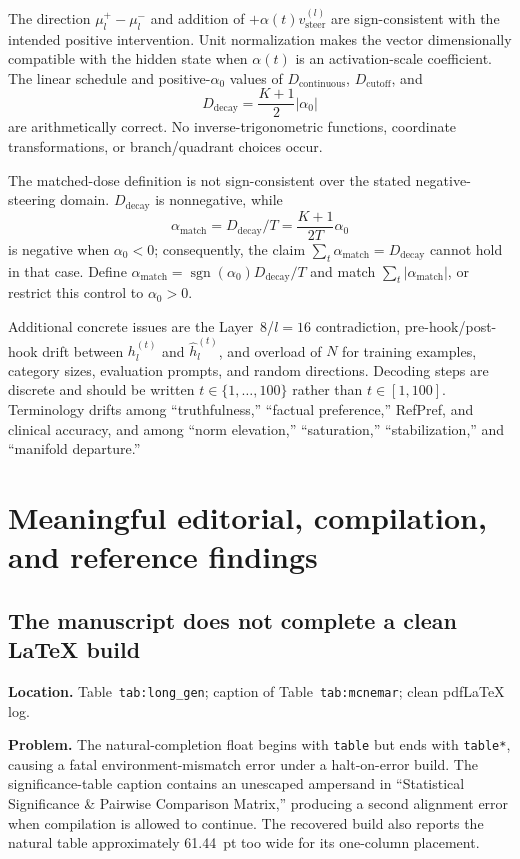 \documentclass[11pt]{article}
\newcommand{\findinglabel}[1]{\textbf{#1}}
\begin{document}
The direction $\mu_l^+-\mu_l^-$ and addition of $+\alpha(t)v_{\text{steer}}^{(l)}$ are sign-consistent with the intended positive intervention.  Unit normalization makes the vector dimensionally compatible with the hidden state when $\alpha(t)$ is an activation-scale coefficient.  The linear schedule and positive-$\alpha_0$ values of $D_{\text{continuous}}$, $D_{\text{cutoff}}$, and
\[
D_{\text{decay}}=\frac{K+1}{2}|\alpha_0|
\]
are arithmetically correct.  No inverse-trigonometric functions, coordinate transformations, or branch/quadrant choices occur.

The matched-dose definition is not sign-consistent over the stated negative-steering domain.  $D_{\text{decay}}$ is nonnegative, while
\[
\alpha_{\text{match}}=D_{\text{decay}}/T
=\frac{K+1}{2T}\alpha_0
\]
is negative when $\alpha_0<0$; consequently, the claim $\sum_t\alpha_{\text{match}}=D_{\text{decay}}$ cannot hold in that case.  Define $\alpha_{\text{match}}=\operatorname{sgn}(\alpha_0)D_{\text{decay}}/T$ and match $\sum_t|\alpha_{\text{match}}|$, or restrict this control to $\alpha_0>0$.

Additional concrete issues are the Layer~8/$l=16$ contradiction, pre-hook/post-hook drift between $h_l^{(t)}$ and $\hat h_l^{(t)}$, and overload of $N$ for training examples, category sizes, evaluation prompts, and random directions.  Decoding steps are discrete and should be written $t\in\{1,\ldots,100\}$ rather than $t\in[1,100]$.  Terminology drifts among ``truthfulness,'' ``factual preference,'' RefPref, and clinical accuracy, and among ``norm elevation,'' ``saturation,'' ``stabilization,'' and ``manifold departure.''

\section*{Meaningful editorial, compilation, and reference findings}

\subsection*{The manuscript does not complete a clean LaTeX build}

\findinglabel{Location.} Table~\texttt{tab:long\_gen}; caption of Table~\texttt{tab:mcnemar}; clean pdfLaTeX log.

\findinglabel{Problem.} The natural-completion float begins with \texttt{table} but ends with \texttt{table*}, causing a fatal environment-mismatch error under a halt-on-error build.  The significance-table caption contains an unescaped ampersand in ``Statistical Significance \& Pairwise Comparison Matrix,'' producing a second alignment error when compilation is allowed to continue.  The recovered build also reports the natural table approximately 61.44~pt too wide for its one-column placement.
\end{document}

